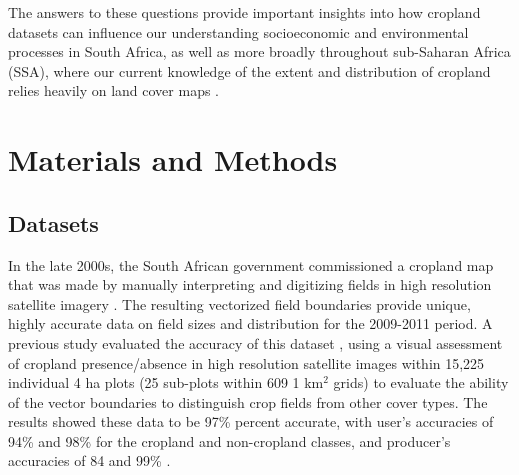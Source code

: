 \documentclass[12 pt, titlepage, a4paper]{article}
\begin{document}
The answers to these questions provide important insights into how cropland datasets can influence our understanding socioeconomic and environmental processes in South Africa, as well as more broadly throughout sub-Saharan Africa (SSA), where our current knowledge of the extent and distribution of cropland relies heavily on land cover maps \citep[][]{fritz_comparison_2010, see_improved_2015}. 

\vspace{-0.5 cm}
\section*{Materials and Methods}
\vspace{-0.3 cm}
\subsection*{Datasets}
\vspace{-0.2 cm}
In the late 2000s, the South African government commissioned a cropland map that was made by manually interpreting and digitizing fields in high resolution satellite imagery \citep{fourie_better_2009}. The resulting vectorized field boundaries provide unique, highly accurate data on field sizes and distribution for the 2009-2011 period. A previous study evaluated the accuracy of this dataset \citep{estes_platform_2016}, using a visual assessment of cropland presence/absence in high resolution satellite images within 15,225 individual 4 ha plots (25 sub-plots within 609 1 km$^2$ grids) to evaluate the ability of the vector boundaries to distinguish crop fields from other cover types. The results showed these data to be 97\% percent accurate, with user's accuracies of 94\% and 98\% for the cropland and non-cropland classes, and producer's accuracies of 84 and 99\% \citep[see SI for more description, and][]{estes_platform_2016}. 
\end{document}
